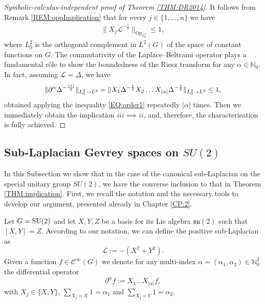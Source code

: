 \documentclass[12pt,oneside,a4paper]{book}
\numberwithin{equation}{section}     %
\theoremstyle{plain}
\theoremstyle{definition}
\DeclareMathOperator{\Op}{Op}
\newcommand{\N}{{\mathbb N}}
\newcommand{\slp}{{\mathcal L}}
\begin{document}
\begin{proof}[Symbolic-calculus-independent proof of Theorem \ref{THM:DR2014}]
	It follows from Remark \ref{REM:oppImplication} that for every $j\in\{1,\dots,n\}$ we have 
	\begin{align}\label{EQ:order1}
	\|X_j\slp^{-\frac{1}{2}}\|_{\Op_{L^2_0}}\leq 1,
	\end{align}
	where $L^2_0$ is the orthogonal complement in $L^2(G)$ of the space of constant functions on $G$.
	The commutativity of the Laplace--Beltrami operator plays a fundamental r\^ole to show the boundedness of the Riesz transform for any $\alpha\in\N_0$. In fact, assuming $\slp =\Delta$, we have
	\begin{align}\notag
	\|\partial^\alpha\Delta^{-\frac{|\alpha|}{2}}\|_{L^2_0\rightarrow L^2}=\|X_1\Delta^{-\frac{1}{2}}X_2\dots X_{|\alpha|}\Delta^{-\frac{1}{2}}\|_{L^2_0\rightarrow L^2}\leq 1,
	\end{align}
	obtained applying the inequality \eqref{EQ:order1} repeatedly $|\alpha|$ times. Then we immediately obtain the implication $iii\implies ii$, and, therefore, the characterisation is fully achieved.
\end{proof}

\subsection{Sub-Laplacian Gevrey spaces on $SU(2)$}
\label{SEC:su2}

In this Subsection we show that in the case of the canonical sub-Laplacian on the special unitary group $SU(2)$, we have the converse inclusion to that in Theorem \ref{THM:implication}. First, we recall the notation and the necessary tools to develop our argument, presented already in Chapter \ref{CP:2}.

Let $G= {\rm SU(2)}$ and let $X,Y,Z$ be a basis for its Lie algebra $\mathfrak{su}(2)$ such that $[X,Y]=Z$. According to our notation, we can define the positive sub-Laplacian as 
\begin{equation}\label{slpSU2}
\slp:=-(X^2+Y^2).
\end{equation}
Given a function $f\in\mathcal{C}^\infty(G)$ we denote for any multi-index $\alpha=(\alpha_1,\alpha_2)\in\N^2_0$ the differential operator
\[
\partial^\alpha f:=X_1\dots X_{|\alpha|}f,
\]
with $X_j\in\{X,Y\}$, $\sum_{X_j=X}1=\alpha_1$ and $\sum_{X_j=Y}1=\alpha_2$.
\end{document}
